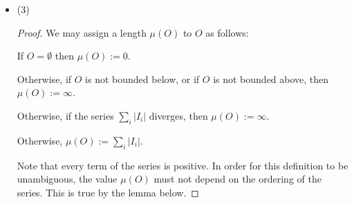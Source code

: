 \begin{itemize}
\begin{proof}

     We want to show that the elements of $\mc I$ are intervals of the form $(I_a, I_b)$

    Let $I \in \mc I$.

    We now show that the elements of $\mc I$ are open sets. Let $I \in \mc I$ and suppose for a contradiction
    that $I$ is not open. Then there exists $x \in I$ such that no neighborhood of $x$ is contained within $I$.
    Let $x$ be such a point and let $N(x)$ be a neighborhood of $x$. We claim
    that $N(x) \cap (\R \setminus O) \neq \emptyset$, i.e. that $N(x)$ contains a point outside $O$.

     We need to show that this is a countable union.

    We can enumerate the intervals as follows:

    Let $q_1, q_2, \ldots$ be an enumeration of the rationals.

    Note that every rational is in zero or one interval, but not more than one. Furthermore, every interval
    contains at least one rational.

    Therefore there is a non-injective surjection from a subset of the rationals to the set of intervals.

    (We can make this a bijection by choosing one rational from each interval?)

    Therefore the cardinality of the set of intervals is not greater than the cardinality of the rationals.

    Therefore the set of intervals is countable.
  \end{proof}

\item (3) 
  \begin{proof}
    We may assign a length $\mu(O)$ to $O$ as follows:

    If $O = \emptyset$ then $\mu(O) := 0$.

    Otherwise, if $O$ is not bounded below, or if $O$ is not bounded above, then $\mu(O) := \infty$.

    Otherwise, if the series $\sum_i |I_i|$ diverges, then $\mu(O) := \infty$.

    Otherwise, $\mu(O) := \sum_i |I_i|$.

    Note that every term of the series is positive. In order for this definition to be unambiguous, the
    value $\mu(O)$ must not depend on the ordering of the series. This is true by the lemma below.
  \end{proof}


\end{itemize}
